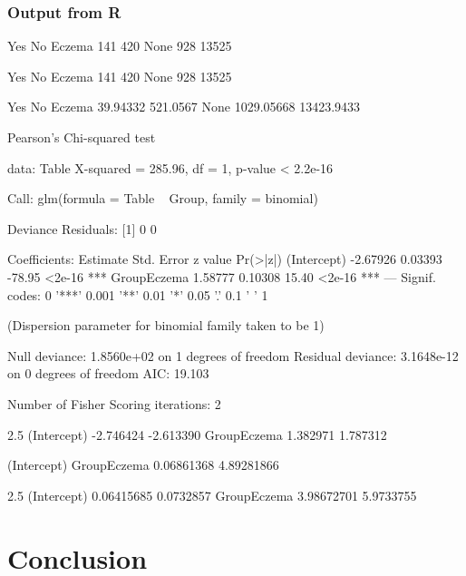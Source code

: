 \documentclass{article}
\begin{document}
		\subsubsection{Output from R}
\begin{Schunk}
\begin{Soutput}
       Yes    No
Eczema 141   420
None   928 13525
\end{Soutput}
\begin{Soutput}
       Yes    No
Eczema 141   420
None   928 13525
\end{Soutput}
\begin{Soutput}
              Yes         No
Eczema   39.94332   521.0567
None   1029.05668 13423.9433
\end{Soutput}
\begin{Soutput}
	Pearson's Chi-squared test

data:  Table
X-squared = 285.96, df = 1, p-value < 2.2e-16
\end{Soutput}
\begin{Soutput}
Call:
glm(formula = Table ~ Group, family = binomial)

Deviance Residuals: 
[1]  0  0

Coefficients:
            Estimate Std. Error z value Pr(>|z|)    
(Intercept) -2.67926    0.03393  -78.95   <2e-16 ***
GroupEczema  1.58777    0.10308   15.40   <2e-16 ***
---
Signif. codes:  0 '***' 0.001 '**' 0.01 '*' 0.05 '.' 0.1 ' ' 1

(Dispersion parameter for binomial family taken to be 1)

    Null deviance: 1.8560e+02  on 1  degrees of freedom
Residual deviance: 3.1648e-12  on 0  degrees of freedom
AIC: 19.103

Number of Fisher Scoring iterations: 2
\end{Soutput}
\begin{Soutput}
                2.5 %    97.5 %
(Intercept) -2.746424 -2.613390
GroupEczema  1.382971  1.787312
\end{Soutput}
\begin{Soutput}
(Intercept) GroupEczema 
 0.06861368  4.89281866 
\end{Soutput}
\begin{Soutput}
                 2.5 %    97.5 %
(Intercept) 0.06415685 0.0732857
GroupEczema 3.98672701 5.9733755
\end{Soutput}
\end{Schunk}

\section{Conclusion}
\end{document}
